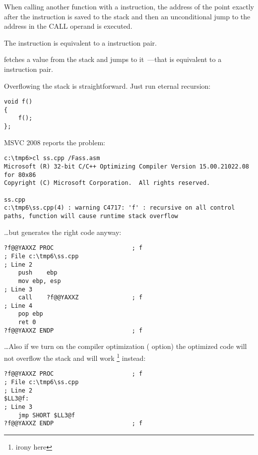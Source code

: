 

When calling another function with a \CALL instruction, the address of the point exactly after the \CALL instruction is saved 
to the stack and then an unconditional jump to the address in the CALL operand is executed.

The \CALL instruction is equivalent to a  instruction pair.

\RET fetches a value from the stack and jumps to it~---that is equivalent to a  instruction pair.

\myindex{\Recursion}
Overflowing the stack is straightforward. Just run eternal recursion:

\begin{lstlisting}
void f()
{
	f();
};
\end{lstlisting}

MSVC 2008 reports the problem:

\begin{lstlisting}
c:\tmp6>cl ss.cpp /Fass.asm
Microsoft (R) 32-bit C/C++ Optimizing Compiler Version 15.00.21022.08 for 80x86
Copyright (C) Microsoft Corporation.  All rights reserved.

ss.cpp
c:\tmp6\ss.cpp(4) : warning C4717: 'f' : recursive on all control paths, function will cause runtime stack overflow
\end{lstlisting}

\dots but generates the right code anyway:

\begin{lstlisting}
?f@@YAXXZ PROC						; f
; File c:\tmp6\ss.cpp
; Line 2
	push	ebp
	mov	ebp, esp
; Line 3
	call	?f@@YAXXZ				; f
; Line 4
	pop	ebp
	ret	0
?f@@YAXXZ ENDP						; f
\end{lstlisting}

\dots Also if we turn on the compiler optimization (\TT{\Ox} option) the optimized code will not overflow the stack 
and will work \footnote{irony here} instead:

\begin{lstlisting}
?f@@YAXXZ PROC						; f
; File c:\tmp6\ss.cpp
; Line 2
$LL3@f:
; Line 3
	jmp	SHORT $LL3@f
?f@@YAXXZ ENDP						; f
\end{lstlisting}

